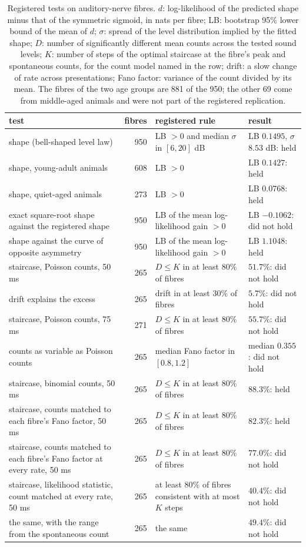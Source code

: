 \begin{table}[tp]
\caption{Registered tests on auditory-nerve fibres. $d$: log-likelihood of the predicted shape minus that of the symmetric sigmoid,
in nats per fibre; LB: bootstrap 95\% lower bound of the mean of $d$; $\sigma$: spread of the level distribution implied by the fitted
shape; $D$: number of significantly different mean counts across the tested sound levels; $K$: number of steps of the optimal
staircase at the fibre's peak and spontaneous counts, for the count model named in the row; drift: a slow change of rate across
presentations; Fano factor: variance of the count divided by its mean. The fibres of the two age groups are 881 of the 950; the other 69 come from
middle-aged animals and were not part of the registered replication.}\label{tab:an}
\centering
\small
\begin{tabular}{>{\raggedright\arraybackslash}p{3.4cm}r>{\raggedright\arraybackslash}p{4.4cm}>{\raggedright\arraybackslash}p{3.6cm}}
\hline
test & fibres & registered rule & result\\
\hline
shape (bell-shaped level law) & 950 & LB $>0$ and median $\sigma$ in $[6,20]$ dB & LB $0.1495$, $\sigma$ $8.53$ dB: held\\
shape, young-adult animals & 608 & LB $>0$ & LB $0.1427$: held\\
shape, quiet-aged animals & 273 & LB $>0$ & LB $0.0768$: held\\
exact square-root shape against the registered shape & 950 & LB of the mean log-likelihood gain $>0$ & LB $-0.1062$: did not hold\\
shape against the curve of opposite asymmetry & 950 & LB of the mean log-likelihood gain $>0$ & LB $1.1048$: held\\
staircase, Poisson counts, 50 ms & 265 & $D\le K$ in at least $80\%$ of fibres & $51.7\%$: did not hold\\
drift explains the excess & 265 & drift in at least $30\%$ of fibres & $5.7\%$: did not hold\\
staircase, Poisson counts, 75 ms & 271 & $D\le K$ in at least $80\%$ of fibres & $55.7\%$: did not hold\\
counts as variable as Poisson counts & 265 & median Fano factor in $[0.8,1.2]$ & median $0.355$: did not hold\\
staircase, binomial counts, 50 ms & 265 & $D\le K$ in at least $80\%$ of fibres & $88.3\%$: held\\
staircase, counts matched to each fibre's Fano factor, 50 ms & 265 & $D\le K$ in at least $80\%$ of fibres & $82.3\%$: held\\
staircase, counts matched to each fibre's Fano factor at every rate, 50 ms & 265 & $D\le K$ in at least $80\%$ of fibres & $77.0\%$: did not hold\\
staircase, likelihood statistic, count matched at every rate, 50 ms & 265 & at least $80\%$ of fibres consistent with at most $K$ steps & $40.4\%$: did not hold\\
the same, with the range from the spontaneous count & 265 & the same & $49.4\%$: did not hold\\
\hline
\end{tabular}
\end{table}

